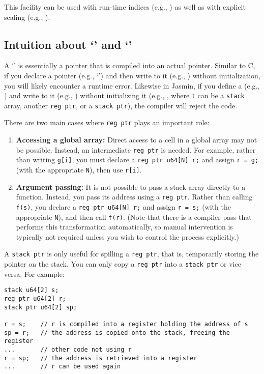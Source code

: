 This facility can be used with run-time indices (e.g., ) as well as with explicit scaling (e.g., ).

\subsection{Intuition about `' and `'}

A `' is essentially a pointer that is compiled into an actual pointer. Similar to C, if you declare a pointer (e.g., `') and then write to it (e.g., ) without initialization, you will likely encounter a runtime error. Likewise in Jasmin, if you define a  (e.g., ) and write to it (e.g., ) without initializing it (e.g., , where \texttt{t} can be a \texttt{stack} array, another \texttt{reg ptr}, or a \texttt{stack ptr}), the compiler will reject the code.

There are two main cases where \texttt{reg ptr} plays an important role:
\begin{enumerate}
	\item \textbf{Accessing a global array:} Direct access to a cell in a global array may not be possible. Instead, an intermediate \texttt{reg ptr} is needed. For example, rather than writing \texttt{g[i]}, you must declare a \texttt{reg ptr u64[N] r;} and assign \texttt{r = g;} (with the appropriate \texttt{N}), then use \texttt{r[i]}.
	\item \textbf{Argument passing:} It is not possible to pass a stack array directly to a function. Instead, you pass its address using a \texttt{reg ptr}. Rather than calling \texttt{f(s)}, you declare a \texttt{reg ptr u64[N] r;} and assign \texttt{r = s;} (with the appropriate \texttt{N}), and then call \texttt{f(r)}. (Note that there is a compiler pass that performs this transformation automatically, so manual intervention is typically not required unless you wish to control the process explicitly.)
\end{enumerate}

A \texttt{stack ptr} is only useful for spilling a \texttt{reg ptr}, that is, temporarily storing the pointer on the stack. You can only copy a \texttt{reg ptr} into a \texttt{stack ptr} or vice versa. For example:

\begin{lstlisting}[style=jasmin]
stack u64[2] s;
reg ptr u64[2] r;
stack ptr u64[2] sp;

r = s;    // r is compiled into a register holding the address of s
sp = r;   // the address is copied onto the stack, freeing the register
...       // other code not using r
r = sp;   // the address is retrieved into a register
...       // r can be used again
\end{lstlisting}